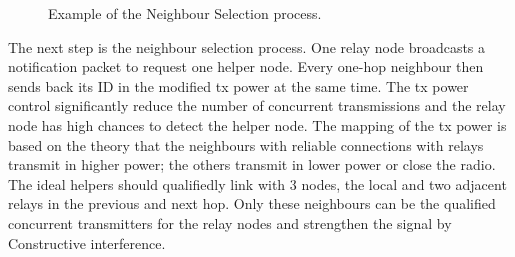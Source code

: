 \documentclass[conference]{IEEEtran}
\begin{document}
\begin{figure}[!t]
\begin{minipage}[!t]{0.25\linewidth}
{}
\caption{Example of the Neighbour Selection process.}
\label{fig:ExpNeighborSelection}
\end{minipage} 
\end{figure}

The next step is the neighbour selection process. One relay node broadcasts a notification packet to request one helper node. Every one-hop neighbour then sends back its ID in the modified tx power at the same time. The tx power control significantly reduce the number of concurrent transmissions and the relay node has high chances to detect the helper node. The mapping of the tx power is based on the theory that the neighbours with reliable connections with relays transmit in higher power; the others transmit in lower power or close the radio. The ideal helpers should qualifiedly link with 3 nodes, the local and two adjacent relays in the previous and next hop. Only these neighbours can be the qualified concurrent transmitters for the relay nodes and strengthen the signal by Constructive interference. %
\end{document}

